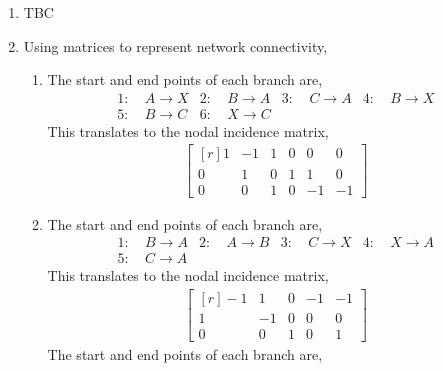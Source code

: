 \begin{enumerate}
    \item TBC

    \item Using matrices to represent network connectivity,
          \begin{enumerate}
              \item The start and end points of each branch are,
                    \begin{align}
                        1 :\  & A \rightarrow X & 2 :\  & B \rightarrow A &
                        3 :\  & C \rightarrow A & 4 :\  & B \rightarrow X   \\
                        5 :\  & B \rightarrow C & 6 :\  & X \rightarrow C &
                    \end{align}
                    This translates to the nodal incidence matrix,
                    \begin{align}
                        \begin{bmatrix*}[r]
                            1 & -1 & 1 & 0 & 0  & 0  \\
                            0 & 1  & 0 & 1 & 1  & 0  \\
                            0 & 0  & 1 & 0 & -1 & -1
                        \end{bmatrix*}
                    \end{align}
              \item The start and end points of each branch are,
                    \begin{align}
                        1 :\  & B \rightarrow A & 2 :\  & A \rightarrow B &
                        3 :\  & C \rightarrow X & 4 :\  & X \rightarrow A   \\
                        5 :\  & C \rightarrow A
                    \end{align}
                    This translates to the nodal incidence matrix,
                    \begin{align}
                        \begin{bmatrix*}[r]
                            -1 & 1  & 0 & -1 & -1 \\
                            1  & -1 & 0 & 0  & 0  \\
                            0  & 0  & 1 & 0  & 1
                        \end{bmatrix*}
                    \end{align}
                    The start and end points of each branch are,
                    \begin{align}

\end{align}
\end{enumerate}
\end{enumerate}
